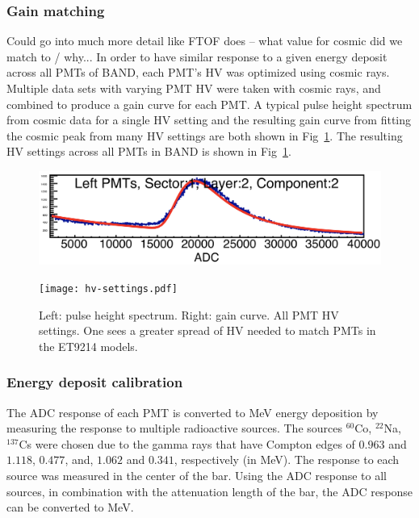 \documentclass[review]{elsarticle}
\begin{document}
\subsubsection{Gain matching}
{\color{red}Could go into much more detail like FTOF does -- what value for cosmic did we match to / why...}
In order to have similar response to a given energy deposit across all PMTs of BAND, each PMT's HV was optimized using
cosmic rays. Multiple data sets with varying PMT HV were taken with cosmic rays, and combined to produce a gain curve for 
each PMT. A typical pulse height spectrum from cosmic data for a single HV setting and the resulting gain curve from fitting the 
cosmic peak from many HV settings are both shown in Fig~\ref{fig:hv_settings}. The resulting HV settings across all PMTs in BAND is 
shown in Fig~\ref{fig:hv_settings}.
\begin{figure}[h!]
	\centering
		\begin{minipage}{0.48\textwidth}
			\includegraphics[width=\textwidth]{adc-spectra.png}\\
			\label{fig:gain}
		\end{minipage}
		\begin{minipage}{0.48\textwidth}
			\texttt{[image: hv-settings.pdf]}
		\end{minipage}
		
		\caption{Left: pulse height spectrum. Right: gain curve. All PMT HV settings. One sees a greater 
		spread of HV needed to match PMTs in the ET9214 models.}
		\label{fig:hv_settings}
\end{figure}


\subsubsection{Energy deposit calibration}
The ADC response of each PMT is converted to \si{\mega\electronvolt} energy deposition by measuring the response to 
multiple radioactive sources. The sources $^{60}$Co, $^{22}$Na, $^{137}$Cs were chosen due to the gamma rays that have 
Compton edges of $0.963$ and $1.118$, $0.477$, and, $1.062$ and $0.341$, respectively (in \si{\mega\electronvolt}). The 
response to each source was measured in the center of the bar. Using the ADC response to all sources, in combination with the 
attenuation length of the bar, the ADC response can be converted to \si{\mega\electronvolt}.
\end{document}
